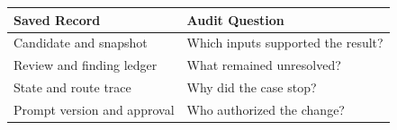 \begin{tabular}{@{}P{4.0cm}P{8.5cm}@{}}
\toprule
\textbf{Saved Record} & \textbf{Audit Question} \\
\midrule
Candidate and snapshot & Which inputs supported the result? \\
Review and finding ledger & What remained unresolved? \\
State and route trace & Why did the case stop? \\
Prompt version and approval & Who authorized the change? \\
\bottomrule
\end{tabular}
